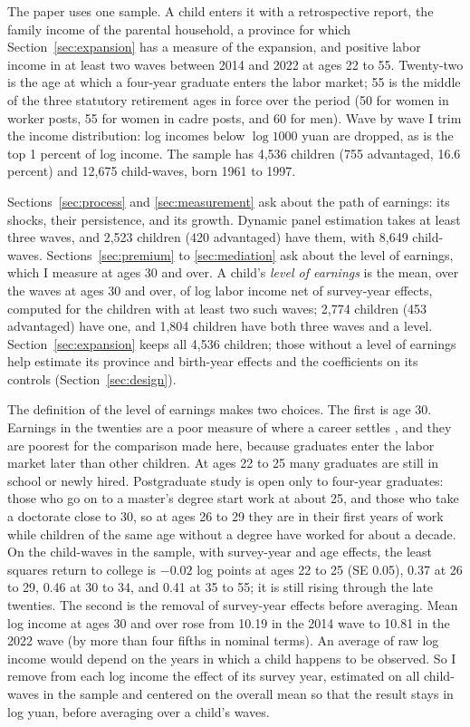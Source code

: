 \documentclass[11pt]{article}
\begin{document}
The paper uses one sample. A child enters it with a retrospective
report, the family income of the parental household, a province for
which Section~\ref{sec:expansion} has a measure of the expansion, and
positive labor income in at least two waves between 2014 and 2022 at
ages 22 to 55. Twenty-two is the age at which a four-year graduate
enters the labor market; 55 is the middle of the three statutory
retirement ages in force over the period (50 for women in worker posts,
55 for women in cadre posts, and 60 for men). Wave by wave I trim the income distribution: log incomes below
$\log 1000$ yuan are dropped, as is the top 1 percent of log income.
The sample has 4,536 children (755 advantaged, 16.6 percent) and 12,675
child-waves, born 1961 to 1997.

Sections~\ref{sec:process} and
\ref{sec:measurement} ask about the path of earnings: its shocks, their
persistence, and its growth. Dynamic panel estimation takes at least three waves, and 2,523 children (420 advantaged) have them, with 8,649
child-waves. Sections~\ref{sec:premium} to \ref{sec:mediation} ask
about the level of earnings, which I measure at ages 30 and over. A
child's \emph{level of earnings} is the mean, over the waves at ages 30
and over, of log labor income net of survey-year effects, computed for
the children with at least two such waves; 2,774 children (453
advantaged) have one, and 1,804 children have both three waves and a
level. Section~\ref{sec:expansion} keeps all 4,536 children; those without a level of earnings help estimate its province and birth-year effects and the coefficients on its controls (Section~\ref{sec:design}).

The definition of the level of earnings makes two choices. The first is age 30.
Earnings in the twenties are a poor measure of where a career settles
\citep{HaiderSolon2006}, and they are poorest for the comparison made
here, because graduates enter the labor market later than other
children. At ages 22 to 25 many graduates are still in school or newly
hired. Postgraduate study is open only to four-year graduates: those
who go on to a master's degree start work at about 25, and those who
take a doctorate close to 30, so at ages 26 to 29 they are in their
first years of work while children of the same age without a degree
have worked for about a decade. On
the child-waves in the sample, with survey-year and age effects, the
least squares return to college is $-0.02$ log points at ages 22 to 25 (SE 0.05),
0.37 at 26 to 29, 0.46 at 30 to 34, and 0.41 at 35 to 55; it is still rising through the late twenties. The second is
the removal of survey-year effects before averaging. Mean log income at
ages 30 and over rose from 10.19 in the 2014 wave to 10.81 in the 2022
wave (by more than four fifths in nominal terms). An average of raw log income would depend on the years in which a
child happens to be observed. So I remove from each log income
the effect of its survey year, estimated on all child-waves in the
sample and centered on the overall mean so that the result stays in
log yuan, before averaging over a child's waves.
\end{document}
